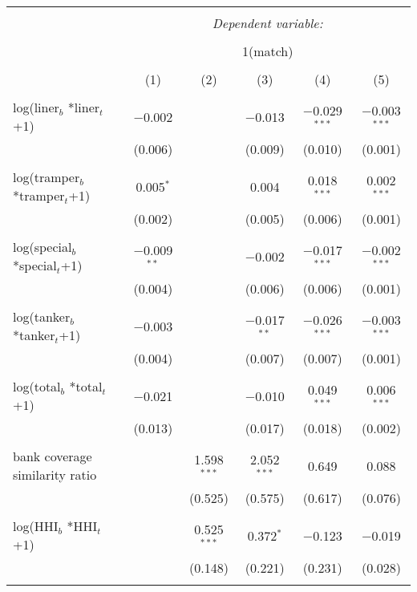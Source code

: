 
\begin{tabular}{@{\extracolsep{5pt}}lccccc} 
\\[-1.8ex]\hline 
\hline \\[-1.8ex] 
 & \multicolumn{5}{c}{\textit{Dependent variable:}} \\ 
\cline{2-6} 
\\[-1.8ex] & \multicolumn{5}{c}{1(match)} \\ 
\\[-1.8ex] & (1) & (2) & (3) & (4) & (5)\\ 
\hline \\[-1.8ex] 
 log(liner$_{b}$ *liner$_{t}$+1) & $-$0.002 &  & $-$0.013 & $-$0.029$^{***}$ & $-$0.003$^{***}$ \\ 
  & (0.006) &  & (0.009) & (0.010) & (0.001) \\ 
  & & & & & \\ 
 log(tramper$_{b}$ *tramper$_{t}$+1) & 0.005$^{*}$ &  & 0.004 & 0.018$^{***}$ & 0.002$^{***}$ \\ 
  & (0.002) &  & (0.005) & (0.006) & (0.001) \\ 
  & & & & & \\ 
 log(special$_{b}$ *special$_{t}$+1) & $-$0.009$^{**}$ &  & $-$0.002 & $-$0.017$^{***}$ & $-$0.002$^{***}$ \\ 
  & (0.004) &  & (0.006) & (0.006) & (0.001) \\ 
  & & & & & \\ 
 log(tanker$_{b}$ *tanker$_{t}$+1) & $-$0.003 &  & $-$0.017$^{**}$ & $-$0.026$^{***}$ & $-$0.003$^{***}$ \\ 
  & (0.004) &  & (0.007) & (0.007) & (0.001) \\ 
  & & & & & \\ 
 log(total$_{b}$ *total$_{t}$+1) & $-$0.021 &  & $-$0.010 & 0.049$^{***}$ & 0.006$^{***}$ \\ 
  & (0.013) &  & (0.017) & (0.018) & (0.002) \\ 
  & & & & & \\ 
 bank coverage similarity ratio &  & 1.598$^{***}$ & 2.052$^{***}$ & 0.649 & 0.088 \\ 
  &  & (0.525) & (0.575) & (0.617) & (0.076) \\ 
  & & & & & \\ 
 log(HHI$_{b}$ *HHI$_{t}$+1) &  & 0.525$^{***}$ & 0.372$^{*}$ & $-$0.123 & $-$0.019 \\ 
  &  & (0.148) & (0.221) & (0.231) & (0.028) \\ 
  & & & & & \\ 

\end{tabular}
